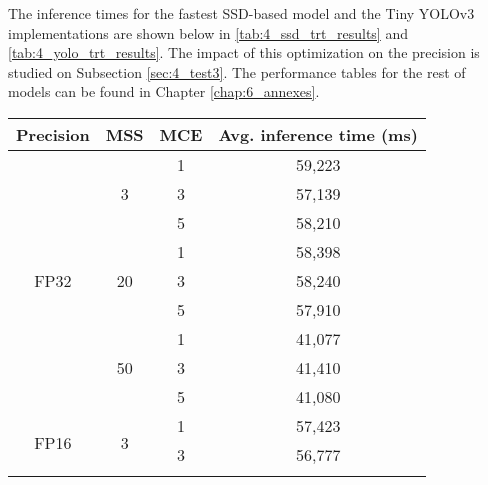 The inference times for the fastest SSD-based model and the Tiny YOLOv3 implementations are shown below in \autoref{tab:4_ssd_trt_results} and \autoref{tab:4_yolo_trt_results}. The impact of this optimization on the precision is studied on Subsection \ref{sec:4_test3}. The performance tables for the rest of models can be found in Chapter \ref{chap:6_annexes}.


\begin{table}[]
	\begin{tabular}{cccc}
		\hline
		\multicolumn{1}{|c|}{\textbf{Precision}}    & \multicolumn{1}{c|}{\textbf{MSS}}        & \multicolumn{1}{c|}{\textbf{MCE}} & \multicolumn{1}{c|}{\textbf{Avg. inference time (ms)}} \\ \hline
		\multicolumn{1}{|c|}{\multirow{9}{*}{FP32}} & \multicolumn{1}{c|}{\multirow{3}{*}{3}}  & \multicolumn{1}{c|}{1}  & \multicolumn{1}{c|}{59,223}    \\ \cline{3-4} 
		\multicolumn{1}{|c|}{}   & \multicolumn{1}{c|}{}          & \multicolumn{1}{c|}{3}  & \multicolumn{1}{c|}{57,139}    \\ \cline{3-4} 
		\multicolumn{1}{|c|}{}   & \multicolumn{1}{c|}{}          & \multicolumn{1}{c|}{5}  & \multicolumn{1}{c|}{58,210}    \\ \cline{2-4} 
		\multicolumn{1}{|c|}{}   & \multicolumn{1}{c|}{\multirow{3}{*}{20}} & \multicolumn{1}{c|}{1}  & \multicolumn{1}{c|}{58,398}    \\ \cline{3-4} 
		\multicolumn{1}{|c|}{}   & \multicolumn{1}{c|}{}          & \multicolumn{1}{c|}{3}  & \multicolumn{1}{c|}{58,240}    \\ \cline{3-4} 
		\multicolumn{1}{|c|}{}   & \multicolumn{1}{c|}{}          & \multicolumn{1}{c|}{5}  & \multicolumn{1}{c|}{57,910}    \\ \cline{2-4} 
		\multicolumn{1}{|c|}{}   & \multicolumn{1}{c|}{\multirow{3}{*}{50}} & \multicolumn{1}{c|}{1}  & \multicolumn{1}{c|}{41,077}    \\ \cline{3-4} 
		\multicolumn{1}{|c|}{}   & \multicolumn{1}{c|}{}          & \multicolumn{1}{c|}{3}  & \multicolumn{1}{c|}{41,410}    \\ \cline{3-4} 
		\multicolumn{1}{|c|}{}   & \multicolumn{1}{c|}{}          & \multicolumn{1}{c|}{5}  & \multicolumn{1}{c|}{41,080}    \\ \hline
		\multicolumn{1}{|c|}{\multirow{9}{*}{FP16}} & \multicolumn{1}{c|}{\multirow{3}{*}{3}}  & \multicolumn{1}{c|}{1}  & \multicolumn{1}{c|}{57,423}    \\ \cline{3-4} 
		\multicolumn{1}{|c|}{}   & \multicolumn{1}{c|}{}          & \multicolumn{1}{c|}{3}  & \multicolumn{1}{c|}{56,777}    \\ \cline{3-4} 

\end{tabular}
\end{table}
